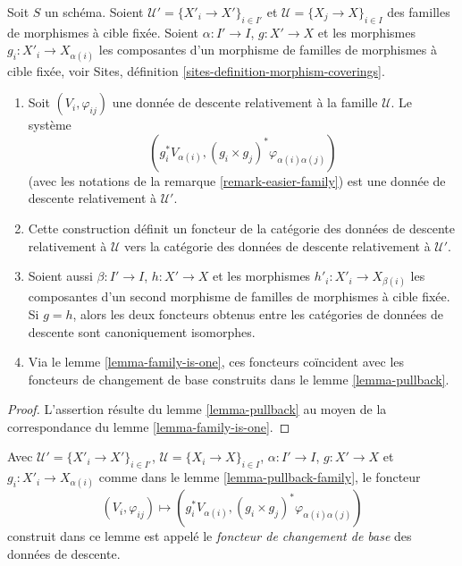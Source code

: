 \begin{lemma}
\label{lemma-pullback-family}
Soit $S$ un schéma. Soient $\mathcal{U}' = \{X'_i \to X'\}_{i \in I'}$ et
$\mathcal{U} = \{X_j \to X\}_{i \in I}$ des familles de morphismes à
cible fixée. Soient $\alpha : I' \to I$, $g : X' \to X$ et les morphismes
$g_i : X'_i \to X_{\alpha(i)}$ les composantes d'un morphisme de familles
de morphismes à cible fixée, voir
Sites, définition \ref{sites-definition-morphism-coverings}.
\begin{enumerate}
\item Soit $(V_i, \varphi_{ij})$ une donnée de descente relativement à la
famille $\mathcal{U}$. Le système
$$
\left(
g_i^*V_{\alpha(i)}, (g_i \times g_j)^*\varphi_{\alpha(i) \alpha(j)}
\right)
$$
(avec les notations de la remarque \ref{remark-easier-family})
est une donnée de descente relativement à $\mathcal{U}'$.
\item Cette construction définit un foncteur de la catégorie des
données de descente relativement à $\mathcal{U}$ vers la catégorie des
données de descente relativement à $\mathcal{U}'$.
\item Soient aussi $\beta : I' \to I$, $h : X' \to X$ et les morphismes
$h'_i : X'_i \to X_{\beta(i)}$ les composantes d'un second morphisme de familles
de morphismes à cible fixée. Si $g = h$, alors les deux foncteurs obtenus
entre les catégories de données de descente sont canoniquement isomorphes.
\item Via le lemme \ref{lemma-family-is-one}, ces foncteurs coïncident
avec les foncteurs de changement de base construits dans le lemme \ref{lemma-pullback}.
\end{enumerate}
\end{lemma}

\begin{proof}
L'assertion résulte du lemme \ref{lemma-pullback} au moyen de la
correspondance du lemme \ref{lemma-family-is-one}.
\end{proof}

\begin{definition}
\label{definition-pullback-functor-family}
Avec $\mathcal{U}' = \{X'_i \to X'\}_{i \in I'}$,
$\mathcal{U} = \{X_i \to X\}_{i \in I}$, $\alpha : I' \to I$,
$g : X' \to X$ et $g_i : X'_i \to X_{\alpha(i)}$ comme dans le
lemme \ref{lemma-pullback-family}, le foncteur
$$
(V_i, \varphi_{ij}) \longmapsto
(g_i^*V_{\alpha(i)}, (g_i \times g_j)^*\varphi_{\alpha(i) \alpha(j)})
$$
construit dans ce lemme
est appelé le {\it foncteur de changement de base} des données de descente.
\end{definition}

